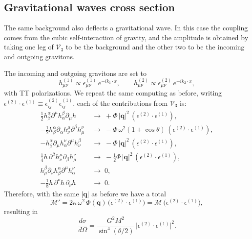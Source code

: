 \documentclass[12pt,a4paper,oneside]{article}
\numberwithin{equation}{section}   %
\begin{document}
\subsection{Gravitational waves cross section}

The same background also deflects a gravitational wave. In this case the
coupling comes from the cubic self-interaction of gravity, and the amplitude is
obtained by taking one leg of $\mathcal V_3$ to be the background and the other
two to be the incoming and outgoing gravitons. 

The incoming and outgoing gravitons are set to
\begin{equation}
  h^{(1)}_{\mu\nu}\propto\epsilon^{(1)}_{\mu\nu}\,e^{-ik_1\cdot x},\qquad
  h^{(2)}_{\mu\nu}\propto\epsilon^{(2)}_{\mu\nu}\,e^{+ik_2\cdot x},
\end{equation}
with TT polarizations. We repeat the same computing as before,
writing $\epsilon^{(2)}\!\cdot\epsilon^{(1)}\equiv\epsilon^{(2)}_{ij}\epsilon^{(1)}_{ij}$,
each of the contributions from $\mathcal V_3$ is:
\begin{align*}
  \tfrac12 h_\beta^\alpha\partial^\mu h_\alpha^\beta\partial_\mu h
  &\;\to\;+\Phi\,|\mathbf q|^2\,(\epsilon^{(2)}\!\cdot\epsilon^{(1)}),\\
  -\tfrac12 h_\beta^\alpha\partial_\alpha h_\nu^\mu\partial^\beta h_\mu^\nu
  &\;\to\;-\Phi\,\omega^2(1+\cos\theta)\,(\epsilon^{(2)}\!\cdot\epsilon^{(1)}),\\
  -h_\beta^\alpha\partial_\mu h_\alpha^\nu\partial^\mu h_\nu^\beta
  &\;\to\;-\Phi\,|\mathbf q|^2\,(\epsilon^{(2)}\!\cdot\epsilon^{(1)}),\\
  \tfrac14 h\,\partial^\beta h_\nu^\mu\partial_\beta h_\mu^\nu
  &\;\to\;-\tfrac12\Phi\,|\mathbf q|^2\,(\epsilon^{(2)}\!\cdot\epsilon^{(1)}),\\
  h_\mu^\beta\partial_\nu h_\beta^\alpha\partial^\mu h_\alpha^\nu
  &\;\to\;0,\\
  -\tfrac18 h\,\partial^\nu h\,\partial_\nu h
  &\;\to\;0 .
\end{align*}
Therefore, with the same $|\mathbf q|$ as before we have a total
\begin{equation}
  \label{eq:M-graviton}
  \mathcal M'=2\kappa\,\omega^2\,\Phi(\mathbf q)\,
  \bigl(\epsilon^{(2)}\!\cdot\epsilon^{(1)}\bigr)
  =\mathcal M\,\bigl(\epsilon^{(2)}\!\cdot\epsilon^{(1)}\bigr),
\end{equation}
resulting in 
\begin{equation}
    \label{eq:xsec-graviton}
    \boxed{
    \frac{d\sigma}{d\Omega}
    = \frac{G^2M^2}{\sin^{4}(\theta/2)}\,
    \bigl|\epsilon^{(2)}\!\cdot\epsilon^{(1)}\bigr|^2.
    }
\end{equation}
\end{document}
